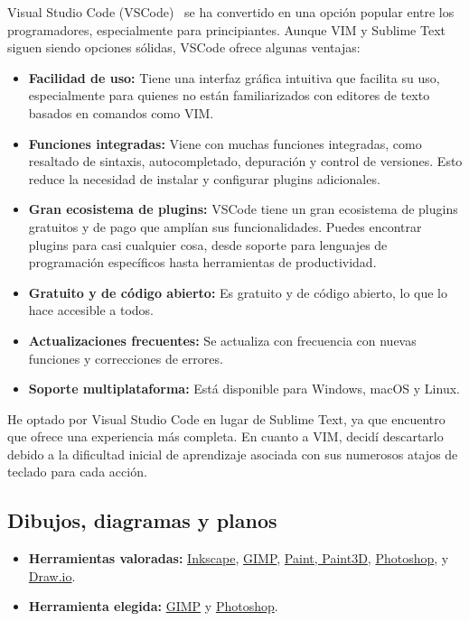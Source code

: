 Visual Studio Code (VSCode)~\cite{misc:vscode} se ha convertido en una opción popular entre los programadores, especialmente para principiantes. Aunque VIM y Sublime Text siguen siendo opciones sólidas, VSCode ofrece algunas ventajas:

\begin{itemize}
	\item \textbf{Facilidad de uso:} Tiene una interfaz gráfica intuitiva que facilita su uso, especialmente para quienes no están familiarizados con editores de texto basados en comandos como VIM.

	\item \textbf{Funciones integradas:} Viene con muchas funciones integradas, como resaltado de sintaxis, autocompletado, depuración y control de versiones. Esto reduce la necesidad de instalar y configurar plugins adicionales.

	\item \textbf{Gran ecosistema de plugins:} VSCode tiene un gran ecosistema de plugins gratuitos y de pago que amplían sus funcionalidades. Puedes encontrar plugins para casi cualquier cosa, desde soporte para lenguajes de programación específicos hasta herramientas de productividad.

	\item \textbf{Gratuito y de código abierto:} Es gratuito y de código abierto, lo que lo hace accesible a todos.

	\item \textbf{Actualizaciones frecuentes:} Se actualiza con frecuencia con nuevas funciones y correcciones de errores.

	\item \textbf{Soporte multiplataforma:} Está disponible para Windows, macOS y Linux.
\end{itemize}

He optado por Visual Studio Code en lugar de Sublime Text, ya que encuentro que ofrece una experiencia más completa. En cuanto a VIM, decidí descartarlo debido a la dificultad inicial de aprendizaje asociada con sus numerosos atajos de teclado para cada acción.

\subsection{Dibujos, diagramas y planos}\label{4:plataformasDibujosYPlanos}

\begin{itemize}
	\item \textbf{Herramientas valoradas:} \href{https://inkscape.org/}{Inkscape}, \href{https://www.gimp.org/}{GIMP}, \href{https://support.microsoft.com/es-es/windows/obtener-microsoft-paint-a6b9578c-ed1c-5b09-0699-4ed8115f9aa9}{Paint, Paint3D}, \href{https://www.adobe.com/es/products/photoshop.html}{Photoshop}, y \href{www.draw.io}{Draw.io}.
	\item \textbf{Herramienta elegida:} \href{https://www.gimp.org/}{GIMP} y \href{https://www.adobe.com/es/products/photoshop.html}{Photoshop}.
\end{itemize}


